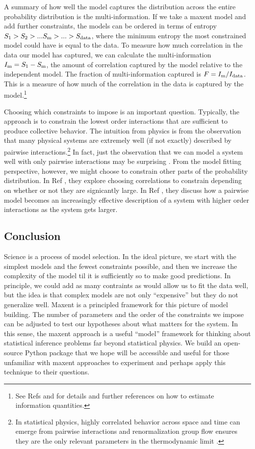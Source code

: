 \documentclass[aps,prl,twocolumn,nofootinbib]{revtex4-1}
\begin{document}
A summary of how well the model captures the distribution across the entire probability distribution is the multi-information. If we take a maxent model and add further constraints, the models can be ordered in terms of entropy $S_{\rm 1}>S_{2}>...S_{\rm m}>...>S_{\rm data}$, where the minimum entropy the most constrained model could have is equal to the data. To measure how much correlation in the data our model has captured, we can calculate the multi-information $I_{\rm m} = S_{\rm 1}-S_{\rm m}$, the amount of correlation captured by the model relative to the independent model. The fraction of multi-information captured is $F=I_{\rm m}/I_{\rm data}$. This is a measure of how much of the correlation in the data is captured by the model.\footnote{See Refs \cite{Bialek:2012ueb} and \cite{Lee:2015ev} for details and further references on how to estimate information quantities.}

Choosing which constraints to impose is an important question. Typically, the approach is to constrain the lowest order interactions that are sufficient to produce collective behavior. The intuition from physics is from the observation that many physical systems are extremely well (if not exactly) described by pairwise interactions.\footnote{In statistical physics, highly correlated behavior across space and time can emerge from pairwise interactions and renormalization group flow ensures they are the only relevant parameters in the thermodynamic limit \cite{}.} In fact, just the observation that we can model a system well with only pairwise interactions may be surprising \cite{Ranganathan:2007wz}. From the model fitting perspective, however, we might choose to constrain other parts of the probability distribution. In Ref \cite{Ganmor:2011ct}, they explore choosing correlations to constrain depending on whether or not they are signicantly large. In Ref \cite{Nemenman:2016kl}, they discuss how a pairwise model becomes an increasingly effective description of a system with higher order interactions as the system gets larger.



\subsection{Conclusion}
Science is a process of model selection. In the ideal picture, we start with the simplest models and the fewest constraints possible, and then we increase the complexity of the model til it is sufficiently so to make good predictions. In principle, we could add as many contraints as would allow us to fit the data well, but the idea is that complex models are not only ``expensive'' but they do not generalize well.
Maxent is a principled framework for this picture of model building. The number of parameters and the order of the constraints we impose can be adjusted to test our hypotheses about what matters for the system.
In this sense, the maxent approach is a useful ``model'' framework for thinking about statistical inference problems far beyond statistical physics. We build an open-source Python package that we hope will be accessible and useful for those unfamiliar with maxent approaches to experiment and perhaps apply this technique to their questions.
\end{document}
